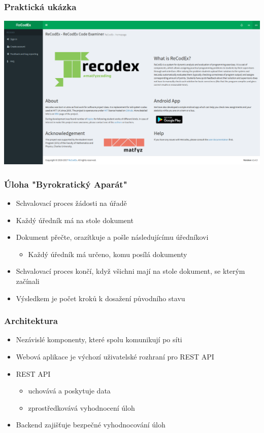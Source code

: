 \documentclass{beamer}
\begin{document}
\begin{frame}
	\frametitle{Praktická ukázka}
	\begin{center}
		\includegraphics[width=1\textwidth]{images/recodex-screen.png}
	\end{center}
\end{frame}

\begin{frame}
	\frametitle{Úloha "Byrokratický Aparát"}
	\begin{itemize}
		\item Schvalovací proces žádosti na úřadě
		\item Každý úředník má na stole dokument
		\item Dokument přečte, orazítkuje a pošle následujícímu úředníkovi
		\begin{itemize}
			\item Každý úředník má určeno, komu posílá dokumenty
		\end{itemize}
		\item Schvalovací proces končí, když všichni mají na stole dokument, se kterým začínali
		\item Výsledkem je počet kroků k dosažení původního stavu
	\end{itemize}
\end{frame}

\begin{frame}
	\frametitle{Architektura}
	\begin{itemize}
		\item Nezávislé komponenty, které spolu komunikují po síti
		\item Webová aplikace je výchozí uživatelské rozhraní pro REST API
		\item REST API 
			\begin{itemize}
				\item uchovává a poskytuje data
				\item zprostředkovává vyhodnocení úloh
			\end{itemize}
		\item Backend zajišťuje bezpečné vyhodnocování úloh
	\end{itemize}
\end{frame}
\end{document}
